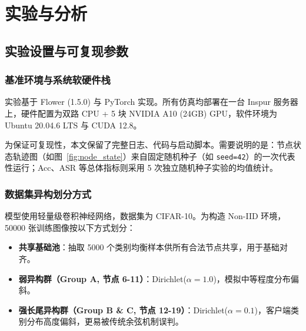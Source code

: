 \documentclass[11pt, a4paper, UTF8, fontset=fandol]{ctexart}
\begin{document}
\section{实验与分析}
\label{sec:experiments}
\subsection{实验设置与可复现参数}

\subsubsection{基准环境与系统软硬件栈}
实验基于 Flower (1.5.0) 与 PyTorch 实现。所有仿真均部署在一台 Inspur 服务器上，硬件配置为双路 CPU + 5 块 NVIDIA A10 (24GB) GPU，软件环境为 Ubuntu 20.04.6 LTS 与 CUDA 12.8。

为保证可复现性，本文保留了完整日志、代码与启动脚本。需要说明的是：节点状态轨迹图（如图~\ref{fig:node_state}）来自固定随机种子（如 \texttt{seed=42}）的一次代表性运行；Acc、ASR 等总体指标则采用 5 次独立随机种子实验的均值统计。

\subsubsection{数据集异构划分方式}
模型使用轻量级卷积神经网络，数据集为 CIFAR-10。为构造 Non-IID 环境，50000 张训练图像按以下方式划分：
\begin{itemize}
    \item \textbf{共享基础池}：抽取 5000 个类别均衡样本供所有合法节点共享，用于基础对齐。
    \item \textbf{弱异构群（Group A, 节点 6-11）}：Dirichlet($\alpha=1.0$)，模拟中等程度分布偏斜。
    \item \textbf{强长尾异构群（Group B \& C, 节点 12-19）}：Dirichlet($\alpha=0.1$)，客户端类别分布高度偏斜，更易被传统余弦机制误判。
\end{itemize}
\end{document}
